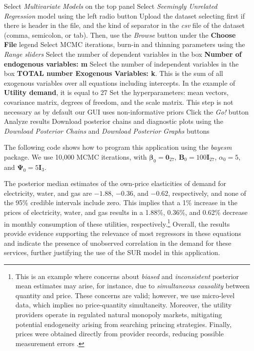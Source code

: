 \begin{algorithm}[h!]
	\caption{Seemingly unrelated regression}\label{alg:SUR}
	\begin{algorithmic}[1]  		 			
		\State Select \textit{Multivariate Models} on the top panel
		\State Select \textit{Seemingly Unrelated Regression} model using the left radio button
		\State Upload the dataset selecting first if there is header in the file, and the kind of separator in the \textit{csv} file of the dataset (comma, semicolon, or tab). Then, use the \textit{Browse} button under the \textbf{Choose File} legend
		\State Select MCMC iterations, burn-in and thinning parameters using the \textit{Range sliders}
		\State Select the number of dependent variables in the box \textbf{Number of endogenous variables: m}
		\State Select the number of independent variables in the box \textbf{TOTAL number Exogenous Variables: k}. This is the sum of all exogenous variables over all equations including intercepts. In the example of \textbf{Utility demand}, it is equal to 27
		\State Set the hyperparameters: mean vectors, covariance matrix, degrees of freedom, and the scale matrix. This step is not necessary as by default our GUI uses non-informative priors
		\State Click the \textit{Go!} button
		\State Analyze results
		\State Download posterior chains and diagnostic plots using the \textit{Download Posterior Chains} and \textit{Download Posterior Graphs} buttons
	\end{algorithmic} 
\end{algorithm}

The following code shows how to program this application using the \textit{bayesm} package. We use 10,000 MCMC iterations, with $\bm{\beta}_0 = \bm{0}_{27}$, $\bm{B}_0 = 100\bm{I}_{27}$, $\alpha_0 = 5$, and $\bm{\Psi}_0 = 5\bm{I}_3$.

The posterior median estimates of the own-price elasticities of demand for electricity, water, and gas are $-1.88$, $-0.36$, and $-0.62$, respectively, and none of the 95\% credible intervals include zero. This implies that a 1\% increase in the prices of electricity, water, and gas results in a 1.88\%, 0.36\%, and 0.62\% decrease in monthly consumption of these utilities, respectively.\footnote{This is an example where concerns about \textit{biased} and \textit{inconsistent} posterior mean estimates may arise, for instance, due to \textit{simultaneous causality} between quantity and price. These concerns are valid; however, we use micro-level data, which implies no price-quantity simultaneity. Moreover, the utility providers operate in regulated natural monopoly markets, mitigating potential endogeneity arising from searching princing strategies. Finally, prices were obtained directly from provider records, reducing possible measurement errors \cite{ramirez2024welfare}.} Overall, the results provide evidence supporting the relevance of most regressors in these equations and indicate the presence of unobserved correlation in the demand for these services, further justifying the use of the SUR model in this application.


